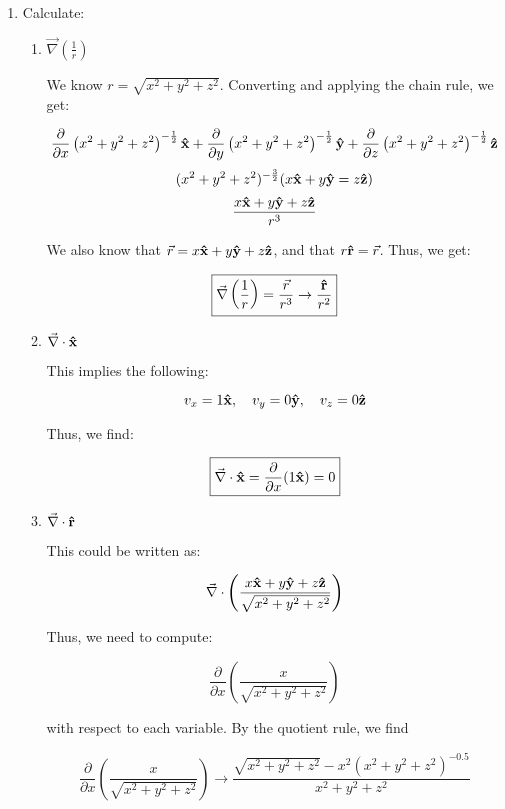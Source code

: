 \begin{enumerate}
    
  \item Calculate:

    \begin{enumerate}

      \item $\vec{\nabla}\left( \frac{1}{r} \right)$

        We know $r=\sqrt{x^2+y^2+z^2}$. Converting and applying the chain rule, we get:

        $$\frac{\partial}{\partial x}\left( x^2+y^2+z^2\right)^{-\frac{1}{2}}\bold{\hat{x}}+\frac{\partial}{\partial y}\left( x^2+y^2+z^2\right)^{-\frac{1}{2}}\bold{\hat{y}}+\frac{\partial}{\partial z}\left( x^2+y^2+z^2\right)^{-\frac{1}{2}}\bold{\hat{z}}$$
        $$(x^2+y^2+z^2)^{-\frac{3}{2}}(x\bold{\hat{x}}+y\bold{\hat{y}}=z\bold{\hat{z}})$$
        $$\frac{x\bold{\hat{x}}+y\bold{\hat{y}}+z\bold{\hat{z}}}{r^3}$$

        We also know that $\vec{r}=x\bold{\hat{x}}+y\bold{\hat{y}}+z\bold{\hat{z}}$, and that $r\bold{\hat{r}}=\vec{r}$. Thus, we get:

        $$\boxed{\vec{\nabla}\left( \frac{1}{r} \right)=\frac{\vec{r}}{r^3}\rightarrow\frac{\bold{\hat{r}}}{r^2}}$$

      \item $\vec{\nabla}\cdot\bold{\hat{x}}$

        This implies the following:

        $$v_x=1\bold{\hat{x}},\quad v_y=0\bold{\hat{y}},\quad v_z=0\bold{\hat{z}}$$

        Thus, we find:

        $$\boxed{\vec{\nabla}\cdot\bold{\hat{x}}=\frac{\partial}{\partial x}(1\bold{\hat{x}})=0}$$

      \item $\vec{\nabla}\cdot\bold{\hat{r}}$

        This could be written as:

        $$\vec{\nabla}\cdot\left( \frac{x\bold{\hat{x}}+y\bold{\hat{y}}+z\bold{\hat{z}}}{\sqrt{x^2+y^2+z^2}} \right)$$

        Thus, we need to compute:

        $$\frac{\partial}{\partial x}\left(\frac{x}{\sqrt{x^2+y^2+z^2}}\right)$$

        with respect to each variable. By the quotient rule, we find

        $$\frac{\partial}{\partial x}\left(\frac{x}{\sqrt{x^2+y^2+z^2}}\right)\rightarrow \frac{\sqrt{x^2+y^2+z^2}-x^2(x^2+y^2+z^2)^{-0.5}}{x^2+y^2+z^2}$$


\end{enumerate}
\end{enumerate}
